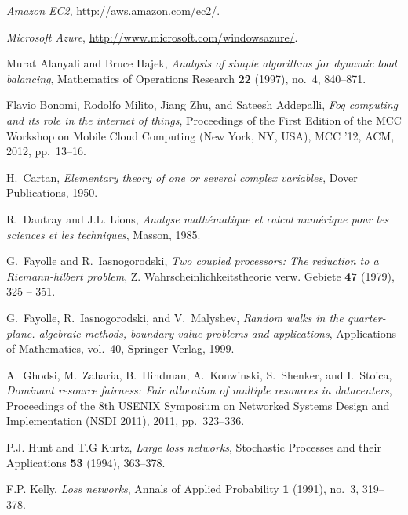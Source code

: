 \documentclass{amsart}
\begin{document}
\providecommand{\bysame}{\leavevmode\hbox to3em{\hrulefill}\thinspace}
\providecommand{\MR}{\relax\ifhmode\unskip\space\fi MR }
\providecommand{\MRhref}[2]{\href{http://www.ams.org/mathscinet-getitem?mr=#1}{#2}
}
\providecommand{\href}[2]{#2}
\begin{thebibliography}{10}

\emph{Amazon {EC2}}, \url{http://aws.amazon.com/ec2/}.

\emph{Microsoft {A}zure}, \url{http://www.microsoft.com/windowsazure/}.

Murat Alanyali and Bruce Hajek, \emph{Analysis of simple algorithms for dynamic
  load balancing}, Mathematics of Operations Research \textbf{22} (1997),
  no.~4, 840--871.

Flavio Bonomi, Rodolfo Milito, Jiang Zhu, and Sateesh Addepalli, \emph{Fog
  computing and its role in the internet of things}, Proceedings of the First
  Edition of the MCC Workshop on Mobile Cloud Computing (New York, NY, USA),
  MCC '12, ACM, 2012, pp.~13--16.

H.~Cartan, \emph{Elementary theory of one or several complex variables}, Dover
  Publications, 1950.

R.~Dautray and J.L. Lions, \emph{Analyse math\'ematique et calcul num\'erique
  pour les sciences et les techniques}, Masson, 1985.

G.~Fayolle and R.~Iasnogorodski, \emph{Two coupled processors: {T}he reduction
  to a {R}iemann-hilbert problem}, Z. Wahrscheinlichkeitstheorie verw. Gebiete
  \textbf{47} (1979), 325 -- 351.

G.~Fayolle, R.~Iasnogorodski, and V.~Malyshev, \emph{Random walks in the
  quarter-plane. algebraic methods, boundary value problems and applications},
  Applications of Mathematics, vol.~40, Springer-Verlag, 1999.

A.~Ghodsi, M.~Zaharia, B.~Hindman, A.~Konwinski, S.~Shenker, and I.~Stoica,
  \emph{Dominant resource fairness: Fair allocation of multiple resources in
  datacenters}, Proceedings of the 8th USENIX Symposium on Networked Systems
  Design and Implementation (NSDI 2011), 2011, pp.~323--336.

P.J. Hunt and T.G Kurtz, \emph{Large loss networks}, Stochastic Processes and
  their Applications \textbf{53} (1994), 363--378.

F.P. Kelly, \emph{Loss networks}, Annals of Applied Probability \textbf{1}
  (1991), no.~3, 319--378.


\end{thebibliography}
\end{document}

